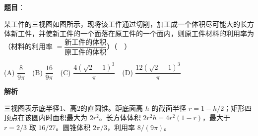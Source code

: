 \begin{answer}

\textbf{题目}：

某工件的三视图如图所示，现将该工件通过切削，加工成一个体积尽可能大的长方体新工件，并使新工件的一个面落在原工件的一个面内，则原工件材料的利用率为（材料的利用率 \(=\dfrac{\text{新工件的体积}}{\text{原工件的体积}}\)）（　）
\nopagebreak[4]
\begin{center}\end{center}
\nopagebreak[4]
(A) \(\dfrac{8}{9\pi}\)　(B) \(\dfrac{16}{9\pi}\)　(C) \(\dfrac{4(\sqrt2-1)^3}{\pi}\)　(D) \(\dfrac{12(\sqrt2-1)^3}{\pi}\)

\textbf{解析}

三视图表示底半径1、高2的直圆锥。距底面高 \(h\) 的截面半径 \(r=1-h/2\)；矩形四顶点在该圆内时面积最大为 \(2r^2\)。长方体体积 \(2r^2h=4r^2(1-r)\)，最大于 \(r=2/3\) 取 \(16/27\)。圆锥体积 \(2\pi/3\)，利用率 \(8/(9\pi)\)。


\end{answer}

